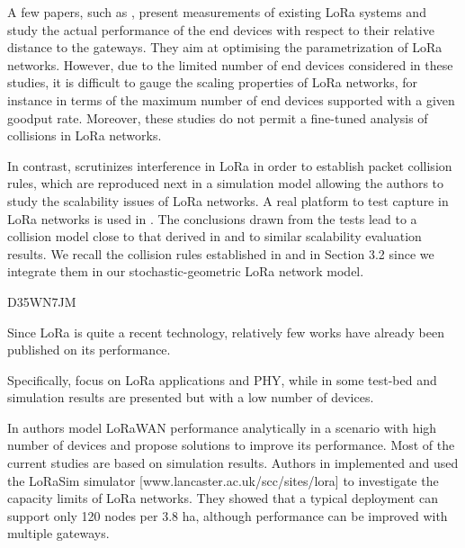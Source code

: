 A few papers,
	such as \cite{petric_measurements_2016},
	present measurements of existing LoRa systems and study the actual performance of the end devices with respect to their relative distance to the gateways.
They aim at optimising the parametrization of LoRa networks.
However,
	due to the limited number of end devices considered in these studies,
	it is difficult to gauge the scaling properties of LoRa networks,
	for instance in terms of the maximum number of end devices supported with a given goodput rate.
Moreover,
	these studies do not permit a fine-tuned analysis of collisions in LoRa networks.

In contrast,
	\cite{jetmir_haxhibeqiri_lora_2017} scrutinizes interference in LoRa in order to establish packet collision rules,
	which are reproduced next in a simulation model allowing the authors to study the scalability issues of LoRa networks.
A real platform to test capture in LoRa networks is used in \cite{bor_lora_2016}.
The conclusions drawn from the tests lead to a collision model close to that derived in \cite{jetmir_haxhibeqiri_lora_2017} and to similar scalability evaluation results.
We recall the collision rules established in \cite{jetmir_haxhibeqiri_lora_2017} and \cite{bor_lora_2016} in Section 3.2 since we integrate them in our stochastic-geometric LoRa network model.

\cite{piva_impact_2017} D35WN7JM

Since LoRa is quite a recent technology,
	relatively few works have already been published on its performance.

Specifically,
	\cite{atanasovski_long-range_2015}focus on LoRa applications and PHY,
	while in \cite{augustin_study_2016} some test-bed and simulation results are presented but with a low number of devices.

In \cite{bankov_limits_2016} authors model LoRaWAN performance analytically in a scenario with high number of devices and propose solutions to improve its performance.
Most of the current studies are based on simulation results.
Authors in \cite{bor_lora_2016} implemented and used the LoRaSim simulator [www.lancaster.ac.uk/scc/sites/lora] to investigate the capacity limits of LoRa networks.
They showed that a typical deployment can support only 120 nodes per 3.8 ha,
	although performance can be improved with multiple gateways.

